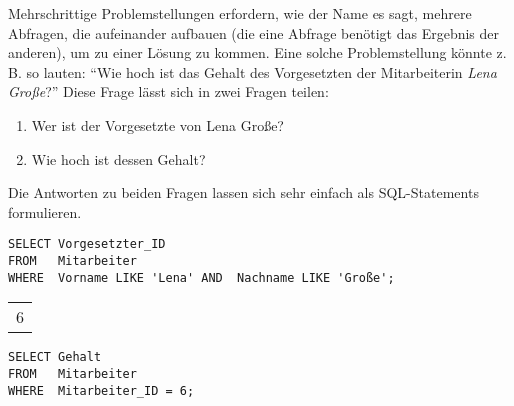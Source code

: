         Mehrschrittige Problemstellungen erfordern, wie der Name es sagt, mehrere Abfragen, die aufeinander aufbauen (die eine Abfrage ben\"otigt das Ergebnis der anderen), um zu einer L\"osung zu kommen. Eine solche Problemstellung k\"onnte z. B. so lauten: \enquote{Wie hoch ist das Gehalt des Vorgesetzten der Mitarbeiterin \textit{Lena Gro\ss{}e}?}
\clearpage
        Diese Frage l\"asst sich in zwei Fragen teilen:
        \begin{enumerate}
          \item Wer ist der Vorgesetzte von Lena Gro\ss{}e?
          \item Wie hoch ist dessen Gehalt?
        \end{enumerate}
        Die Antworten zu beiden Fragen lassen sich sehr einfach als SQL-Statements formulieren.
        \begin{lstlisting}[language=oracle_sql,caption={Wer ist der Vorgesetzte von Lena Gro\ss{}e},label=sql06_01]
SELECT Vorgesetzter_ID
FROM   Mitarbeiter
WHERE  Vorname LIKE 'Lena' AND  Nachname LIKE 'Große';
        \end{lstlisting}
        \begin{center}
          \begin{small}
            \tablehead{}
            \begin{msoraclesql}
              \begin{supertabular}{r}
                6 \\
              \end{supertabular}
            \end{msoraclesql}
          \end{small}
        \end{center}
        \begin{lstlisting}[language=oracle_sql,caption={Wie hoch ist dessen Gehalt},label=sql06_02]
SELECT Gehalt
FROM   Mitarbeiter
WHERE  Mitarbeiter_ID = 6;
        \end{lstlisting}
